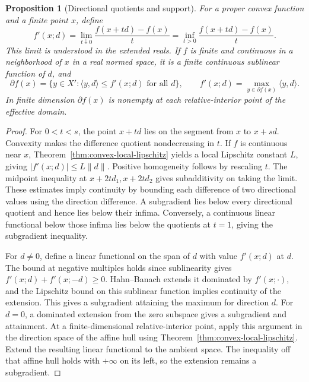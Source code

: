 \documentclass[11pt,oneside,openany]{book}
\theoremstyle{plain}
\newtheorem{proposition}[theorem]{Proposition}
\theoremstyle{definition}
\theoremstyle{remark}
\begin{document}
\begin{proposition}[Directional quotients and support]
\label{prop:directional-support}
For a proper convex function and a finite point \(x\), define
\[
 f'(x;d)=\lim_{t\downarrow0}
     \frac{f(x+td)-f(x)}{t}
    =\inf_{t>0}\frac{f(x+td)-f(x)}{t}.
\]
This limit is understood in the extended reals. If \(f\) is
finite and continuous in a neighborhood of \(x\) in a real
normed space, it is a finite continuous sublinear function of
\(d\), and
\[
 \partial f(x)=\{y\in X':\langle y,d\rangle\le f'(x;d)
                              \text{ for all }d\},
 \qquad
 f'(x;d)=\max_{y\in\partial f(x)}\langle y,d\rangle .
\]
In finite dimension \(\partial f(x)\) is nonempty at each
relative-interior point of the effective domain.
\end{proposition}

\begin{proof}
For \(0<t<s\), the point \(x+td\) lies on the segment from
\(x\) to \(x+sd\). Convexity makes the difference quotient
nondecreasing in \(t\). If \(f\) is continuous near \(x\),
Theorem~\ref{thm:convex-local-lipschitz} yields a local
Lipschitz constant \(L\), giving \(|f'(x;d)|\le L\lVert
d\rVert\). Positive homogeneity follows by rescaling \(t\).
The midpoint inequality at \(x+2td_1,x+2td_2\) gives
subadditivity on taking the limit. These estimates imply
continuity by bounding each difference of two directional
values using the direction difference.
A subgradient lies below every directional quotient
and hence lies below their infima. Conversely, a continuous
linear functional below those infima lies below the
quotients at \(t=1\), giving the subgradient inequality.

For \(d\neq0\), define a linear functional on the span of
\(d\) with value \(f'(x;d)\) at \(d\). The bound at negative
multiples holds since sublinearity gives
\(f'(x;d)+f'(x;-d)\ge0\).
Hahn--Banach extends it dominated by \(f'(x;\cdot)\), and the
Lipschitz bound on this sublinear function implies continuity
of the extension. This gives a subgradient attaining the
maximum for direction \(d\). For \(d=0\), a dominated
extension from the zero subspace gives a subgradient and
attainment. At a finite-dimensional relative-interior point,
apply this argument in the direction space of the affine
hull using Theorem~\ref{thm:convex-local-lipschitz}. Extend
the resulting linear functional to the ambient space.
The inequality off that affine hull holds with \(+\infty\)
on its left, so the extension remains a subgradient.
\end{proof}
\end{document}

